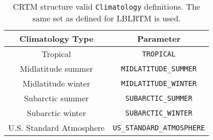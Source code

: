 \begin{table}
  \centering
  \begin{tabular}{|c|c|}
    \hline
    \sffamily\textbf{Climatology Type} & \sffamily\textbf{Parameter} \\
    \hline\hline
             Tropical          &  \texttt{TROPICAL}\\              
        Midlatitude summer     &  \texttt{MIDLATITUDE\_SUMMER}\\
        Midlatitude winter     &  \texttt{MIDLATITUDE\_WINTER}\\
         Subarctic summer      &  \texttt{SUBARCTIC\_SUMMER}\\
         Subarctic winter      &  \texttt{SUBARCTIC\_WINTER}\\
     U.S. Standard Atmosphere  &  \texttt{US\_STANDARD\_ATMOSPHERE}\\
    \hline 
  \end{tabular}
  \caption{CRTM \Atmosphere{} structure valid \texttt{Climatology} definitions. The same set as defined for LBLRTM is used.}
  \label{tab:climatology}
\end{table}

